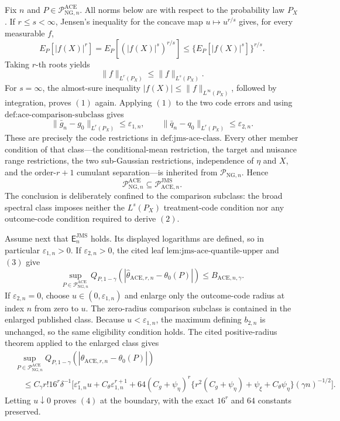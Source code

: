 Fix \(n\) and \(P\in\mathcal P_{\mathrm{NG},n}^{\mathrm{ACE}}\).  All norms below are with respect to the probability law \(P_X\).  If \(r\le s<\infty\), Jensen's inequality for the concave map \(u\mapsto u^{r/s}\) gives, for every measurable \(f\),
\[
 E_P[|f(X)|^r]
 =E_P[(|f(X)|^s)^{r/s}]
 \le\{E_P[|f(X)|^s]\}^{r/s}.
\]
Taking \(r\)-th roots yields
\[
 \|f\|_{L^r(P_X)}\le\|f\|_{L^s(P_X)}. \tag{1}
\]
For \(s=\infty\), the almost-sure inequality \(|f(X)|\le\|f\|_{L^\infty(P_X)}\), followed by integration, proves \((1)\) again.  Applying \((1)\) to the two code errors and using \(\text{def:ace-comparison-subclass}\) gives
\[
 \|\bar g_n-g_0\|_{L^r(P_X)}\le\varepsilon_{1,n},
 \qquad
 \|\bar q_n-q_0\|_{L^r(P_X)}\le\varepsilon_{2,n}. \tag{2}
\]
These are precisely the code restrictions in \(\text{def:jms-ace-class}\).  Every other member condition of that class---the conditional-mean restriction, the target and nuisance range restrictions, the two sub-Gaussian restrictions, independence of \(\eta\) and \(X\), and the order-\(r+1\) cumulant separation---is inherited from \(\mathcal P_{\mathrm{NG},n}\).  Hence
\[
 \mathcal P_{\mathrm{NG},n}^{\mathrm{ACE}}
 \subseteq\mathcal P_{\mathrm{ACE},n}^{\mathrm{JMS}}. \tag{3}
\]
The conclusion is deliberately confined to the comparison subclass: the broad spectral class imposes neither the \(L^s(P_X)\) treatment-code condition nor any outcome-code condition required to derive \((2)\).

Assume next that \(\mathsf E_n^{\mathrm{JMS}}\) holds.  Its displayed logarithms are defined, so in particular \(\varepsilon_{1,n}>0\).  If \(\varepsilon_{2,n}>0\), the cited leaf \(\text{lem:jms-ace-quantile-upper}\) and \((3)\) give
\[
 \sup_{P\in\mathcal P_{\mathrm{NG},n}^{\mathrm{ACE}}}
 Q_{P,1-\gamma}
 \!\left(|\widehat\theta_{\mathrm{ACE},r,n}-\theta_0(P)|\right)
 \le B_{\mathrm{ACE},n,\gamma}. \tag{4}
\]
If \(\varepsilon_{2,n}=0\), choose \(u\in(0,\varepsilon_{1,n})\) and enlarge only the outcome-code radius at index \(n\) from zero to \(u\).  The zero-radius comparison subclass is contained in the enlarged published class.  Because \(u<\varepsilon_{1,n}\), the maximum defining \(b_{2,n}\) is unchanged, so the same eligibility condition holds.  The cited positive-radius theorem applied to the enlarged class gives
\[
 \begin{aligned}
 &\sup_{P\in\mathcal P_{\mathrm{NG},n}^{\mathrm{ACE}}}
 Q_{P,1-\gamma}
 \!\left(|\widehat\theta_{\mathrm{ACE},r,n}-\theta_0(P)|\right)\\
 &\quad\le C_{\gamma}r!16^r\delta^{-1}
 \Big[\varepsilon_{1,n}^r u+C_{\theta}\varepsilon_{1,n}^{r+1}
 +64(C_g+\psi_{\eta})^r
 \{r^2(C_g+\psi_{\eta})+\psi_{\xi}+C_{\theta}\psi_{\eta}\}
 (\gamma n)^{-1/2}\Big].
 \end{aligned}
\]
Letting \(u\downarrow0\) proves \((4)\) at the boundary, with the exact \(16^r\) and \(64\) constants preserved.

